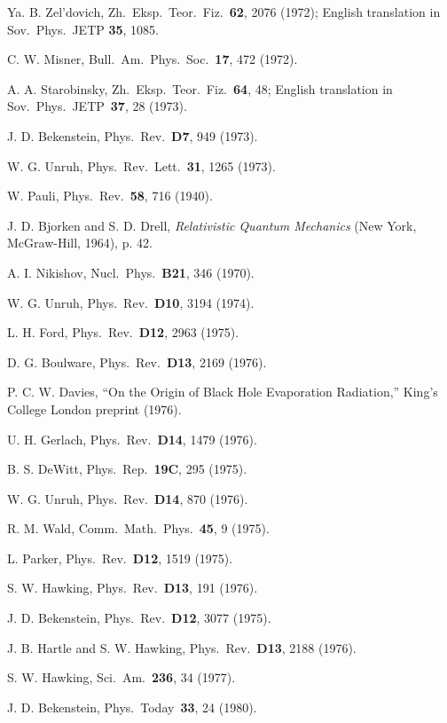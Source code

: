 \documentclass[12pt]{article} \usepackage{latexsym}
\begin{document}
\begin{thebibliography}{99}
 Ya. B. Zel'dovich, Zh.\ Eksp.\ Teor.\ Fiz.\ {\bf 62},
  2076 (1972); English translation in Sov.\ Phys.\ JETP {\bf 35},
  1085.

 C. W. Misner, Bull.\ Am.\ Phys.\ Soc.\ {\bf 17}, 472
  (1972).

 A. A. Starobinsky, Zh.\ Eksp.\ Teor.\ Fiz.\ {\bf 64},
  48; English translation in Sov.\ Phys.\ JETP\ {\bf 37}, 28 (1973).

 J. D. Bekenstein, Phys.\ Rev.\ {\bf D7}, 949 (1973).

 W. G. Unruh, Phys.\ Rev.\ Lett.\ {\bf 31}, 1265 (1973).

 W. Pauli, Phys.\ Rev.\ {\bf 58}, 716 (1940).

 J. D. Bjorken and S. D. Drell, \emph{Relativistic Quantum
  Mechanics} (New York, McGraw-Hill, 1964), p. 42.

 A. I. Nikishov, Nucl.\ Phys.\ {\bf B21}, 346 (1970).

 W. G. Unruh, Phys.\ Rev.\ {\bf D10}, 3194 (1974).

 L. H. Ford, Phys.\ Rev.\ {\bf D12}, 2963 (1975).

 D. G. Boulware, Phys.\ Rev.\ {\bf D13}, 2169 (1976).

 P. C. W. Davies, ``On the Origin of Black Hole
  Evaporation Radiation,'' King's College London preprint (1976).

 U. H. Gerlach, Phys.\ Rev.\ {\bf D14}, 1479 (1976).

 B. S. DeWitt, Phys.\ Rep.\ {\bf 19C}, 295 (1975).

 W. G. Unruh, Phys.\ Rev.\ {\bf D14}, 870 (1976).

 R. M. Wald, Comm.\ Math.\ Phys.\ {\bf 45}, 9 (1975).

 L. Parker, Phys.\ Rev.\ {\bf D12}, 1519 (1975).

 S. W. Hawking, Phys.\ Rev.\ {\bf D13}, 191 (1976).

 J. D. Bekenstein, Phys.\ Rev.\ {\bf D12}, 3077 (1975).

 J. B. Hartle and S. W. Hawking, Phys.\ Rev.\ {\bf D13},
  2188 (1976).

 S. W. Hawking, Sci.\ Am.\ {\bf 236}, 34 (1977).

 J. D. Bekenstein, Phys.\ Today\ {\bf 33}, 24 (1980).


\end{thebibliography}
\end{document}
